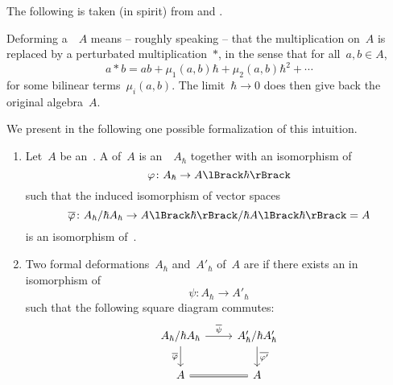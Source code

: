 \documentclass[a4paper, 11pt, oneside]{scrartcl}
\begin{document}
The following is taken (in spirit) from \cite[\S 5.2]{pieter_hochschild} and \cite{gerstenhaber_quantum}.

\begin{motivation}
  Deforming a~\algebra{$\kf$}~$A$ means -- roughly speaking -- that the multiplication on~$A$ is replaced by a perturbated multiplication~$*$, in the sense that for all~$a, b \in A$,
  \[
    a * b
    =
    ab + \mu_1(a,b) \hbar + \mu_2(a,b) \hbar^2 + \dotsb
  \]
  for some bilinear terms~$\mu_i(a,b)$.
  The limit~$\hbar \to 0$ does then give back the original algebra~$A$.
\end{motivation}

We present in the following one possible formalization of this intuition.

\begin{definition}
  \label{definition of algebra deformations}
  \leavevmode
  \begin{enumerate}
    \item
      Let~$A$ be an~\algebra{$\kf$}.
      A  of~$A$ is an~\algebra{$\kfhbar$}~$A_\hbar$ together with an isomorphism of~\modules{$\kfhbar$}
      \[
        \varphi
        \colon
        A_{\hbar}
        \to
        \power{A}{\hbar}
      \]
      such that the induced isomorphism of vector spaces
      \[
        \induced{\varphi}
        \colon
        A_{\hbar} / \hbar A_{\hbar}
        \to
        \power{A}{\hbar} / \hbar \power{A}{\hbar}
        =
        A
      \]
      is an isomorphism of~\algebras{$\kf$}.
    \item
      Two formal deformations~$A_{\hbar}$ and~$A'_{\hbar}$ of~$A$ are  if there exists an in isomorphism of~\algebras{$\kfhbar$}
      \[
        \psi
        \colon
        A_{\hbar}
        \to
        A'_{\hbar}
      \]
      such that the following square diagram commutes:
      \[
        \begin{tikzcd}
          A_{\hbar} / \hbar A_{\hbar}
          \arrow{r}[above]{\induced{\psi}}
          \arrow{d}[left]{\induced{\varphi}}
          &
          A'_{\hbar} / \hbar A'_{\hbar}
          \arrow{d}[right]{\induced{\varphi'}}
          \\
          A
          \arrow[equal]{r}
          &
          A
        \end{tikzcd}
      \]
  \end{enumerate}
\end{definition}
\end{document}

